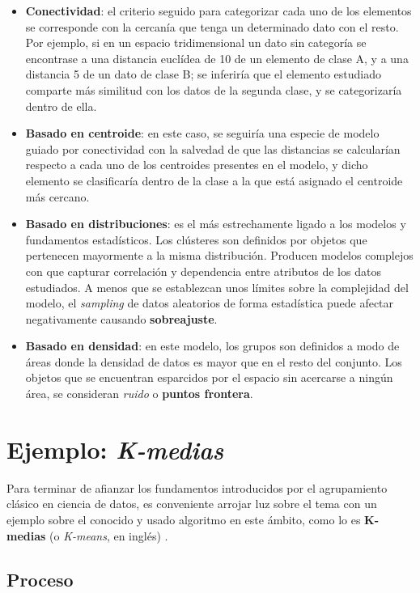 \documentclass[]{report}
\begin{document}
			\begin{itemize}
				\item \textbf{Conectividad}: el criterio seguido para categorizar cada uno de los elementos se corresponde con la cercanía que tenga un determinado dato con el resto. Por ejemplo, si en un espacio tridimensional un dato sin categoría se encontrase a una distancia euclídea de 10 de un elemento de clase A, y a una distancia 5 de un dato de clase B; se inferiría que el elemento estudiado comparte más similitud con los datos de la segunda clase, y se categorizaría dentro de ella.
				\item \textbf{Basado en centroide}: en este caso, se seguiría una especie de modelo guiado por conectividad con la salvedad de que las distancias se calcularían respecto a cada uno de los centroides presentes en el modelo, y dicho elemento se clasificaría dentro de la clase a la que está asignado el centroide más cercano.
				\item \textbf{Basado en distribuciones}: es el más estrechamente ligado a los modelos y fundamentos estadísticos. Los clústeres son definidos por objetos que pertenecen mayormente a la misma distribución. Producen modelos complejos con que capturar correlación y dependencia entre atributos de los datos estudiados. A menos que se establezcan unos límites sobre la complejidad del modelo, el \textit{sampling} de datos aleatorios de forma estadística puede afectar negativamente causando \textbf{sobreajuste}.
				\item \textbf{Basado en densidad}: en este modelo, los grupos son definidos a modo de áreas donde la densidad de datos es mayor que en el resto del conjunto. Los objetos que se encuentran esparcidos por el espacio sin acercarse a ningún área, se consideran \textit{ruido} o \textbf{puntos frontera}.
			\end{itemize}
		
		\section{Ejemplo: \textit{K-medias}}
		
			Para terminar de afianzar los fundamentos introducidos por el agrupamiento clásico en ciencia de datos, es conveniente arrojar luz sobre el tema con un ejemplo sobre el conocido y usado algoritmo en este ámbito, como lo es \textbf{K-medias} (o \textit{K-means}, en inglés) \cite{k-means}.
		
			\subsection{Proceso}
		
\end{document}

